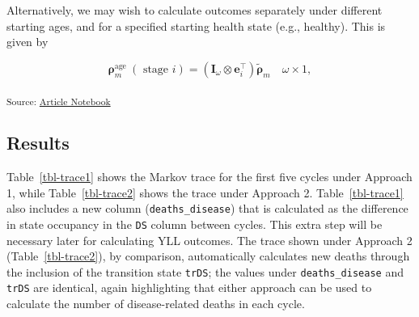 \documentclass[
]{agujournal2019}
\begin{document}
Alternatively, we may wish to calculate outcomes separately under
different starting ages, and for a specified starting health state
(e.g., healthy). This is given by

\[
\boldsymbol{\rho}_{m}^{\text {age }}(\text { stage } i)=\left(\mathbf{I}_{\omega} \otimes \mathbf{e}_{i}^{\top}\right) \tilde{\boldsymbol{\rho}}_{m} \quad \omega \times 1,
\]

\textsubscript{Source:
\href{https://graveja0.github.io/dalys/index.qmd.html}{Article
Notebook}}

\subsection{Results}\label{results}

Table~\ref{tbl-trace1} shows the Markov trace for the first five cycles
under Approach 1, while Table~\ref{tbl-trace2} shows the trace under
Approach 2. Table~\ref{tbl-trace1} also includes a new column
(\texttt{deaths\_disease}) that is calculated as the difference in state
occupancy in the \texttt{DS} column between cycles. This extra step will
be necessary later for calculating YLL outcomes. The trace shown under
Approach 2 (Table~\ref{tbl-trace2}), by comparison, automatically
calculates new deaths through the inclusion of the transition state
\texttt{trDS}; the values under \texttt{deaths\_disease} and
\texttt{trDS} are identical, again highlighting that either approach can
be used to calculate the number of disease-related deaths in each cycle.

\begin{table}

\caption{\label{tbl-trace1}Markov Trace Under Approach 1}


\end{table}%
\end{document}
